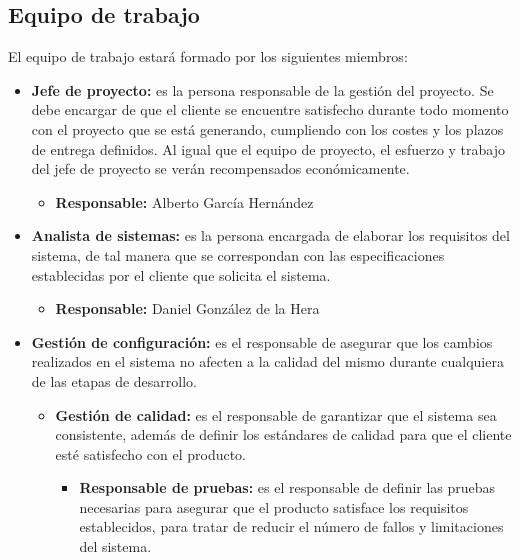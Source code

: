 \subsection{Equipo de trabajo}
\par El equipo de trabajo estará formado por los siguientes miembros:
\begin{itemize}
\item \textbf{Jefe de proyecto:} es la persona responsable de la gestión del proyecto. Se debe encargar de que el cliente se encuentre satisfecho durante todo momento con el proyecto que se está generando, cumpliendo con los costes y los plazos de entrega definidos. Al igual que el equipo de proyecto, el esfuerzo y trabajo del jefe de proyecto se verán recompensados económicamente.
  \begin{itemize}
  \item \textbf{Responsable:} Alberto García Hernández
  \end{itemize}
\item \textbf{Analista de sistemas:} es la persona encargada de elaborar los requisitos del sistema, de tal manera que se correspondan con las especificaciones establecidas por el cliente que solicita el sistema.
  \begin{itemize}
  \item \textbf{Responsable:} Daniel González de la Hera
  \end{itemize}
\item \textbf{Gestión de configuración:} es el responsable de asegurar que los cambios realizados en el sistema no afecten a la calidad del mismo durante cualquiera de las etapas de desarrollo. \begin{itemize}
  \begin{itemize}
  \item \textbf{Responsable:} Juan Abascal Sánchez
  \end{itemize}
\item \textbf{Gestión de calidad:} es el responsable de garantizar que el sistema sea consistente, además de definir los estándares de calidad para que el cliente esté satisfecho con el producto. \begin{itemize}
  \begin{itemize}
  \item \textbf{Responsable:} Adriana Lima
  \end{itemize}
\item \textbf{Responsable de pruebas:} es el responsable de definir las pruebas necesarias para asegurar que el producto satisface los requisitos establecidos, para tratar de reducir el número de fallos y limitaciones del sistema.

\end{itemize}
\end{itemize}
\end{itemize}
